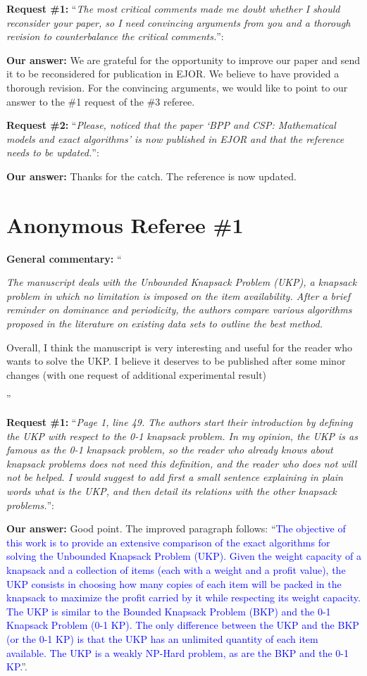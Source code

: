 \documentclass{elsarticle}
\begin{document}
\textbf{Request \#1:} ``\textit{The most critical comments made me doubt whether I should reconsider your paper, so I need convincing arguments from you and a thorough revision to counterbalance the critical comments.}'':

\textbf{Our answer:} We are grateful for the opportunity to improve our paper and send it to be reconsidered for publication in EJOR. We believe to have provided a thorough revision. For the convincing arguments, we would like to point to our answer to the \#1 request of the \#3 referee.

\textbf{Request \#2:} ``\textit{Please, noticed that the paper `BPP and CSP: Mathematical models and exact algorithms' is now published in EJOR and that the reference needs to be updated.}'':

\textbf{Our answer:} Thanks for the catch. The reference is now updated.

\section{Anonymous Referee \#1}

\textbf{General commentary:} ``{\itshape
The manuscript deals with the Unbounded Knapsack Problem (UKP), a knapsack problem in which no limitation is imposed on the item availability. After a brief reminder on dominance and periodicity, the authors compare various algorithms proposed in the literature on existing data sets to outline the best method.

Overall, I think the manuscript is very interesting and useful for the reader who wants to solve the UKP. I believe it deserves to be published after some minor changes (with one request of additional experimental result)
}''

\textbf{Request \#1:} ``\textit{Page 1, line 49. The authors start their introduction by defining the UKP with respect to the 0-1 knapsack problem. In my opinion, the UKP is as famous as the 0-1 knapsack problem, so the reader who already knows about knapsack problems does not need this definition, and the reader who does not will not be helped. I would suggest to add first a small sentence explaining in plain words what is the UKP, and then detail its relations with the other knapsack problems.}'':

\textbf{Our answer:} Good point. The improved paragraph follows: ``\textcolor{blue}{The objective of this work is to provide an extensive comparison of the exact algorithms for solving the Unbounded Knapsack Problem (UKP). Given the weight capacity of a knapsack and a collection of items (each with a weight and a profit value), the UKP consists in choosing how many copies of each item will be packed in the knapsack to maximize the profit carried by it while respecting its weight capacity. The UKP is similar to the Bounded Knapsack Problem (BKP) and the 0-1 Knapsack Problem (0-1 KP). The only difference between the UKP and the BKP (or the 0-1 KP) is that the UKP has an unlimited quantity of each item available. The UKP is a weakly NP-Hard problem, as are the BKP and the 0-1 KP.}''.
\bigskip
\end{document}
